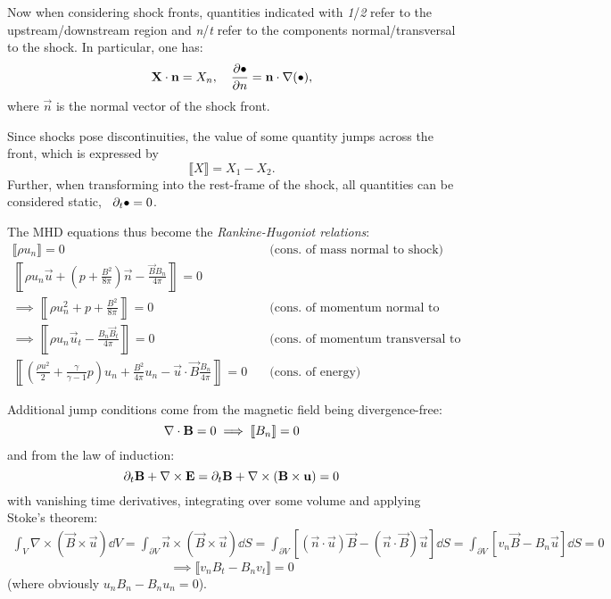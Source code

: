 Now when considering shock fronts, quantities indicated with
\emph{1}/\emph{2} refer to the upstream/downstream region and
\emph{n}/\emph{t} refer to the components normal/transversal to the shock.
In particular, one has:
\begin{equation*}
    \vec{X}\cdot\vec{n}=X_n\qc\pdv{\bullet}{n}=\vec{n}\cdot\nabla(\bullet),
\end{equation*}
where $\vec{n}$ is the normal vector of the shock front.

Since shocks pose discontinuities, the value of some quantity jumps across
the front, which is expressed by
\begin{equation*}
    \llbracket X \rrbracket=X_1-X_2.
\end{equation*}
Further, when transforming into the rest-frame of the shock, all quantities
can be considered static, \ie~$\partial_t\bullet=0$.

The MHD equations thus become the \emph{Rankine-Hugoniot relations}:
\begin{subequations}
\begin{align}
    \llbracket\rho u_n\rrbracket=0 & \quad\text{(cons.~of mass normal to
    shock)} \\
    \left\llbracket\rho{u_n}\vec{u}+\left(p+\frac{B^2}{8\pi}\right)\vec{n}-\frac{\vec{B}B_n}{4\pi}\right\rrbracket=0
    & \nonumber \\
    \implies
        \left\llbracket\rho{u_n^2}+p+\frac{B^2}{8\pi}\right\rrbracket=0
        & \quad\text{(cons.~of momentum normal to shock)} \\
    \implies
        \left\llbracket\rho{u_n}\vec{u}_t-\frac{B_n\vec{B}_t}{4\pi}\right\rrbracket=0
        & \quad\text{(cons.~of momentum transversal to shock)} \\
    \left\llbracket\left(\frac{\rho{u^2}}{2}+\frac{\gamma}{\gamma-1}p\right)u_n+\frac{B^2}{4\pi}u_n-\vec{u}\cdot\vec{B}\frac{B_n}{4\pi}\right\rrbracket=0
    & \quad\text{(cons.~of energy)}
\end{align}
\end{subequations}

Additional jump conditions come from the magnetic field being
divergence-free:
\begin{equation}
    \nabla\cdot\mathbf{B}=0\implies\llbracket{B_n}\rrbracket=0
\end{equation}
and from the law of induction:
\begin{equation*}
    \partial_t\mathbf{B}+\nabla\times\mathbf{E}=\partial_t\mathbf{B}+\nabla\times(\mathbf{B}\times\mathbf{u})=0
\end{equation*}
with vanishing time derivatives, integrating over some volume and applying
Stoke's theorem:
\begin{align*}
    \int_V\nabla\times\left(\vec{B}\times\vec{u}\right)\dd{V}
    =\int_{\partial{V}}\vec{n}\times\left(\vec{B}\times\vec{u}\right)\dd{S}
    =\int_{\partial{V}}\left[(\vec{n}\cdot{\vec{u}})\vec{B}-(\vec{n}\cdot\vec{B})\vec{u}\right]\dd{S}
    =\int_{\partial{V}}\left[v_n\vec{B}-B_n\vec{u}\right]\dd{S}=0
\end{align*}
\begin{equation}
    \implies \llbracket v_n B_t-B_n v_t \rrbracket = 0
\end{equation}
(where obviously $u_n B_n - B_n u_n = 0$).

